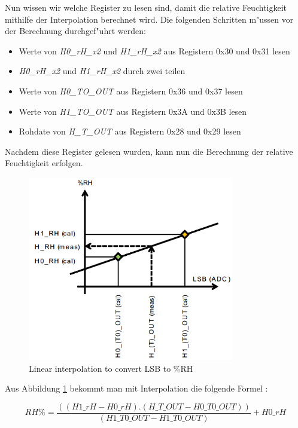 Nun wissen wir welche Register zu lesen sind, damit die relative Feuchtigkeit mithilfe der Interpolation berechnet wird. Die folgenden Schritten m"ussen vor der Berechnung durchgef"uhrt werden:

\begin{itemize}
	\item Werte von \textit{H0\_rH\_x2} und \textit{H1\_rH\_x2} aus Registern 0x30 und 0x31 lesen 
	\item \textit{H0\_rH\_x2} und \textit{H1\_rH\_x2} durch zwei teilen
	\item Werte von \textit{H0\_TO\_OUT} aus Registern 0x36 und 0x37 lesen 
	\item Werte von \textit{H1\_TO\_OUT} aus Registern 0x3A und 0x3B lesen
	\item Rohdate von \textit{H\_T\_OUT} aus Registern 0x28 und 0x29 lesen
\end{itemize}

Nachdem diese Register gelesen wurden, kann nun die Berechnung der relative Feuchtigkeit erfolgen.

\begin{figure}[h]
	\centering
	\includegraphics[width=9cm]{source/images/rH}
	\caption{Linear interpolation to convert LSB to \%RH \cite{HTS221}}\label{fig:rH}
\end{figure}

\vspace{3cm}
Aus Abbildung \ref{fig:rH} bekommt man mit Interpolation die folgende Formel \cite{HTS221}:

\begin{center}
	\[
	RH\% = \frac{((H1\_rH - H0\_rH) . (H\_T\_OUT - H0\_T0\_OUT))}{(H1\_T0\_OUT - H1\_T0\_OUT) } + H0\_rH  
	\]\label{HumFormel}
\end{center}


